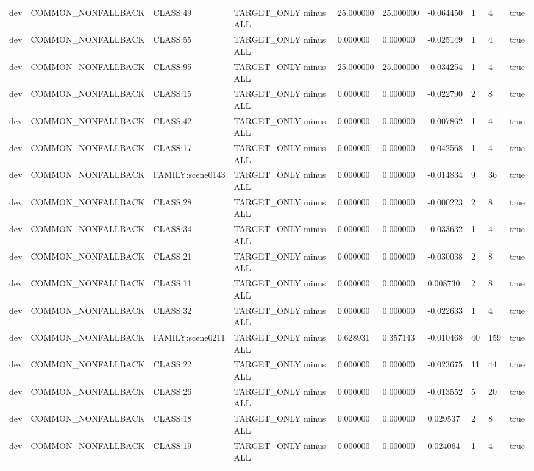 \begin{tabular}{llllllllll}
dev & COMMON\_NONFALLBACK & CLASS:49 & TARGET\_ONLY minus ALL & 25.000000 & 25.000000 & -0.064450 & 1 & 4 & true \\
dev & COMMON\_NONFALLBACK & CLASS:55 & TARGET\_ONLY minus ALL & 0.000000 & 0.000000 & -0.025149 & 1 & 4 & true \\
dev & COMMON\_NONFALLBACK & CLASS:95 & TARGET\_ONLY minus ALL & 25.000000 & 25.000000 & -0.034254 & 1 & 4 & true \\
dev & COMMON\_NONFALLBACK & CLASS:15 & TARGET\_ONLY minus ALL & 0.000000 & 0.000000 & -0.022790 & 2 & 8 & true \\
dev & COMMON\_NONFALLBACK & CLASS:42 & TARGET\_ONLY minus ALL & 0.000000 & 0.000000 & -0.007862 & 1 & 4 & true \\
dev & COMMON\_NONFALLBACK & CLASS:17 & TARGET\_ONLY minus ALL & 0.000000 & 0.000000 & -0.042568 & 1 & 4 & true \\
dev & COMMON\_NONFALLBACK & FAMILY:scene0143 & TARGET\_ONLY minus ALL & 0.000000 & 0.000000 & -0.014834 & 9 & 36 & true \\
dev & COMMON\_NONFALLBACK & CLASS:28 & TARGET\_ONLY minus ALL & 0.000000 & 0.000000 & -0.000223 & 2 & 8 & true \\
dev & COMMON\_NONFALLBACK & CLASS:34 & TARGET\_ONLY minus ALL & 0.000000 & 0.000000 & -0.033632 & 1 & 4 & true \\
dev & COMMON\_NONFALLBACK & CLASS:21 & TARGET\_ONLY minus ALL & 0.000000 & 0.000000 & -0.030038 & 2 & 8 & true \\
dev & COMMON\_NONFALLBACK & CLASS:11 & TARGET\_ONLY minus ALL & 0.000000 & 0.000000 & 0.008730 & 2 & 8 & true \\
dev & COMMON\_NONFALLBACK & CLASS:32 & TARGET\_ONLY minus ALL & 0.000000 & 0.000000 & -0.022633 & 1 & 4 & true \\
dev & COMMON\_NONFALLBACK & FAMILY:scene0211 & TARGET\_ONLY minus ALL & 0.628931 & 0.357143 & -0.010468 & 40 & 159 & true \\
dev & COMMON\_NONFALLBACK & CLASS:22 & TARGET\_ONLY minus ALL & 0.000000 & 0.000000 & -0.023675 & 11 & 44 & true \\
dev & COMMON\_NONFALLBACK & CLASS:26 & TARGET\_ONLY minus ALL & 0.000000 & 0.000000 & -0.013552 & 5 & 20 & true \\
dev & COMMON\_NONFALLBACK & CLASS:18 & TARGET\_ONLY minus ALL & 0.000000 & 0.000000 & 0.029537 & 2 & 8 & true \\
dev & COMMON\_NONFALLBACK & CLASS:19 & TARGET\_ONLY minus ALL & 0.000000 & 0.000000 & 0.024064 & 1 & 4 & true \\

\end{tabular}

